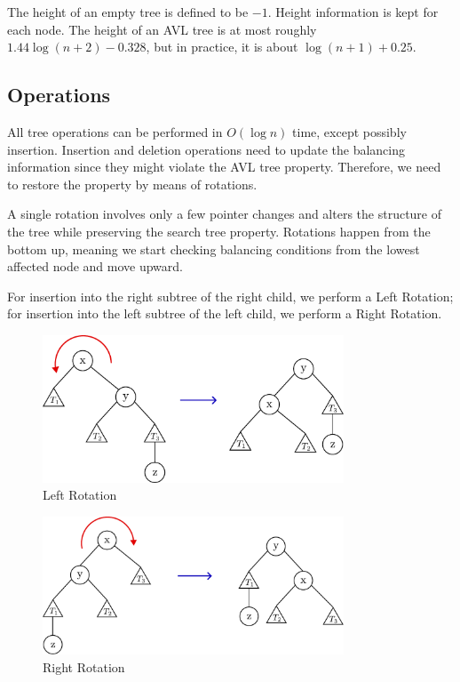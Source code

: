 The height of an empty tree is defined to be \(-1\). Height information is kept for each node. The height of an AVL tree is at most roughly \(1.44\log (n + 2) - 0.328\), but in practice, it is about \(\log (n + 1) + 0.25\).

\subsection{Operations}
All tree operations can be performed in \(O(\log n)\) time, except possibly insertion. Insertion and deletion operations need to update the balancing information since they might violate the AVL tree property. Therefore, we need to restore the property by means of rotations.

A single rotation involves only a few pointer changes and alters the structure of the tree while preserving the search tree property. Rotations happen from the bottom up, meaning we start checking balancing conditions from the lowest affected node and move upward.

For insertion into the right subtree of the right child, we perform a Left Rotation; for insertion into the left subtree of the left child, we perform a Right Rotation. 

\begin{minipage}{0.5\textwidth}
\begin{figure}[H]
  \centering
  \includegraphics[width=0.8\textwidth]{Figure/RR.pdf}
  \caption*{Left Rotation}
\end{figure}
\end{minipage}
\begin{minipage}{0.5\textwidth}
\begin{figure}[H]
  \centering
  \includegraphics[width=0.8\textwidth]{Figure/LL.pdf}
  \caption*{Right Rotation}
\end{figure}
\end{minipage}

